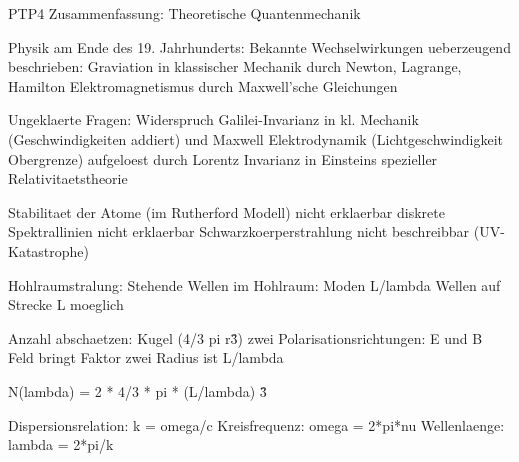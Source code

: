 \documentclass{article}
\begin{document}
\begin{center}
\large
PTP4 Zusammenfassung: Theoretische Quantenmechanik
\end{center}


Physik am Ende des 19. Jahrhunderts: 
Bekannte Wechselwirkungen ueberzeugend beschrieben: 
Graviation in klassischer Mechanik durch Newton, Lagrange, Hamilton
Elektromagnetismus durch Maxwell'sche Gleichungen

Ungeklaerte Fragen: 
Widerspruch Galilei-Invarianz in kl. Mechanik (Geschwindigkeiten addiert) und Maxwell Elektrodynamik (Lichtgeschwindigkeit Obergrenze) aufgeloest durch Lorentz Invarianz in Einsteins spezieller Relativitaetstheorie

Stabilitaet der Atome (im Rutherford Modell) nicht erklaerbar
diskrete Spektrallinien nicht erklaerbar
Schwarzkoerperstrahlung nicht beschreibbar (UV-Katastrophe)

Hohlraumstralung: 
Stehende Wellen im Hohlraum: Moden
L/lambda Wellen auf Strecke L moeglich

Anzahl abschaetzen:
Kugel (4/3 pi r\^3)
zwei Polarisationsrichtungen: E und B Feld bringt Faktor zwei
Radius ist L/lambda 

N(lambda)  = 2 * 4/3 * pi * (L/lambda) \^3

Dispersionsrelation: k = omega/c
Kreisfrequenz: omega = 2*pi*nu
Wellenlaenge: lambda = 2*pi/k
\end{document}
